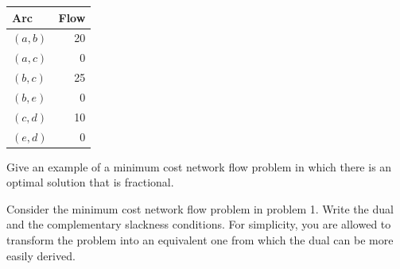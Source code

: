 \documentclass[fleqn]{homework}
\begin{document}
\begin{problem}{1}
\begin{question}
      \begin{tabular}{|l|r|}
        \hline
        Arc & Flow \\
        \hline
        $(a,b)$ & 20 \\
        $(a,c)$ & 0 \\
        $(b,c)$ & 25 \\
        $(b,e)$ & 0 \\
        $(c,d)$ & 10 \\
        $(e,d)$ & 0 \\
        \hline
      \end{tabular}
    \end{question}
  \end{problem}

  \begin{problem}{2}
    \begin{question}
      Give an example of a minimum cost network flow problem in which there is
      an optimal solution that is fractional.
    \end{question}
  \end{problem}

  \begin{problem}{3}
    \begin{question}
      Consider the minimum cost network flow problem in problem 1.  Write the
      dual and the complementary slackness conditions.  For simplicity, you are
      allowed to transform the problem into an equivalent one from which the
      dual can be more easily derived.
    \end{question}
  \end{problem}
\end{document}

